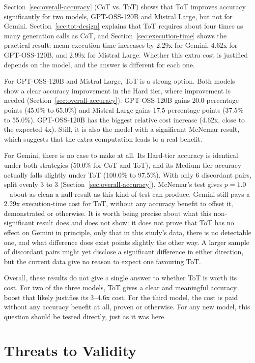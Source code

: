 Section~\ref{sec:overall-accuracy} (CoT vs. ToT) shows that ToT improves
accuracy significantly for two models, GPT-OSS-120B and Mistral Large,
but not for Gemini. Section~\ref{sec:tot-design} explains that ToT
requires about four times as many generation calls as CoT, and
Section~\ref{sec:execution-time} shows the practical result: mean execution
time increases by 2.29x for Gemini, 4.62x for GPT-OSS-120B, and 2.99x
for Mistral Large. Whether this extra cost is justified depends on the
model, and the answer is different for each one.

For GPT-OSS-120B and Mistral Large, ToT is a strong option. Both models
show a clear accuracy improvement in the Hard tier, where improvement is
needed (Section~\ref{sec:overall-accuracy}): GPT-OSS-120B gains 20.0
percentage points (45.0\% to 65.0\%) and Mistral Large gains 17.5
percentage points (37.5\% to 55.0\%). GPT-OSS-120B has the biggest
relative cost increase (4.62x, close to the expected 4x). Still, it is
also the model with a significant McNemar result, which suggests that
the extra computation leads to a real benefit.

For Gemini, there is no case to make at all. Its Hard-tier accuracy is
identical under both strategies (50.0\% for CoT and ToT), and its
Medium-tier accuracy actually falls slightly under ToT (100.0\% to
97.5\%). With only 6 discordant pairs, split evenly 3 to 3
(Section~\ref{sec:overall-accuracy}), McNemar's test gives $p = 1.0$ --
about as clean a null result as this kind of test can produce. Gemini
still pays a 2.29x execution-time cost for ToT, without any accuracy
benefit to offset it, demonstrated or otherwise. It is worth being
precise about what this non-significant result does and does not show:
it does not prove that ToT has no effect on Gemini in principle, only
that in this study's data, there is no detectable one, and what
difference does exist points slightly the other way. A larger sample of
discordant pairs might yet disclose a significant difference in either
direction, but the current data give no reason to expect one favouring
ToT.

Overall, these results do not give a single answer to whether ToT is
worth its cost. For two of the three models, ToT gives a clear and
meaningful accuracy boost that likely justifies its 3--4.6x cost. For
the third model, the cost is paid without any accuracy benefit at all,
proven or otherwise. For any new model, this question should be tested
directly, just as it was here.

\section{Threats to Validity}
\label{sec:threats-validity}

